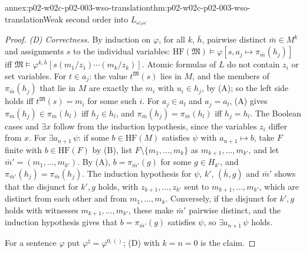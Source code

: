 \begin{annexitem}{annex:p02-w02c-p02-003-wso-translation}{thm:p02-w02c-p02-003-wso-translation}{Weak second order into \(L_{\omega_1\omega}\)}
\begin{proof}
\emph{(D) Correctness.}  By induction on \(\varphi\), for all \(k\),
\(\bar h\), pairwise distinct \(\bar m\in M^k\) and assignments \(s\) to the
individual variables:
\(\mathrm{HF}(\mathfrak M)\models\varphi[s,a_j\mapsto\pi_{\bar m}(h_j)]\)
iff \(\mathfrak M\models\varphi^{k,\bar h}[s(m_1/z_1)\cdots(m_k/z_k)]\).
Atomic formulas of \(L\) do not contain \(z_i\) or set variables.  For
\(t\in a_j\): the value \(t^{\mathfrak M}(s)\) lies in \(M\), and the
members of \(\pi_{\bar m}(h_j)\) that lie in \(M\) are exactly the
\(m_i\) with \(u_i\in h_j\), by (A); so the left side holds iff
\(t^{\mathfrak M}(s)=m_i\) for some such \(i\).  For \(a_j\in a_l\) and
\(a_j=a_l\), (A) gives \(\pi_{\bar m}(h_j)\in\pi_{\bar m}(h_l)\) iff
\(h_j\in h_l\), and \(\pi_{\bar m}(h_j)=\pi_{\bar m}(h_l)\) iff
\(h_j=h_l\).  The Boolean cases and \(\exists x\) follow from the induction
hypothesis, since the variables \(z_i\) differ from \(x\).  For
\(\exists a_{n+1}\,\psi\): if some \(b\in\mathrm{HF}(M)\) satisfies
\(\psi\) with \(a_{n+1}\mapsto b\), take \(F\) finite with
\(b\in\mathrm{HF}(F)\) by (B), list \(F\setminus\{m_1,\ldots,m_k\}\) as
\(m_{k+1},\ldots,m_{k'}\), and let \(\bar m'=(m_1,\ldots,m_{k'})\).  By
(A), \(b=\pi_{\bar m'}(g)\) for some \(g\in H_{k'}\), and
\(\pi_{\bar m'}(h_j)=\pi_{\bar m}(h_j)\).  The induction hypothesis for
\(\psi\), \(k'\), \((\bar h,g)\) and \(\bar m'\) shows that the disjunct for
\(k',g\) holds, with \(z_{k+1},\ldots,z_{k'}\) sent to
\(m_{k+1},\ldots,m_{k'}\), which are distinct from each other and from
\(m_1,\ldots,m_k\).  Conversely, if the disjunct for \(k',g\) holds with
witnesses \(m_{k+1},\ldots,m_{k'}\), these make \(\bar m'\) pairwise
distinct, and the induction hypothesis gives that \(b=\pi_{\bar m'}(g)\)
satisfies \(\psi\), so \(\exists a_{n+1}\,\psi\) holds.

For a sentence \(\varphi\) put \(\varphi^{\natural}=\varphi^{0,()}\); (D)
with \(k=n=0\) is the claim.


\end{proof}
\end{annexitem}
